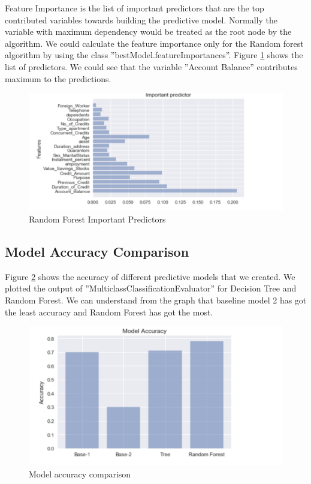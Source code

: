 \documentclass[sigconf]{acmart}
\begin{document}
Feature Importance is the list of important predictors that are the top contributed variables towards building the predictive model. Normally the variable with maximum dependency would be treated as the root node by the algorithm. We could calculate the feature importance only for the Random forest algorithm by using the class ''bestModel.featureImportances''. Figure \ref{fig:Figure22} shows the list of predictors. We could see that the variable ''Account Balance'' contributes maximum to the predictions. 

\begin{figure}[htb]
  \centering
  \includegraphics[width=1.0\columnwidth]{images/Figure22.png}
  \caption{Random Forest Important Predictors}
  \label{fig:Figure22} 
\end{figure}

\subsection{Model Accuracy Comparison} 

Figure \ref{fig:Figure23} shows the accuracy of different predictive models that we created. We plotted the output of ''MulticlassClassificationEvaluator'' for Decision Tree and Random Forest. We can understand from the graph that baseline model 2 has got the least accuracy and Random Forest has got the most. 

\begin{figure}[htb]
  \centering
  \includegraphics[width=1.0\columnwidth]{images/Figure23.png}
  \caption{Model accuracy comparison}
  \label{fig:Figure23} 
\end{figure}
\end{document}
